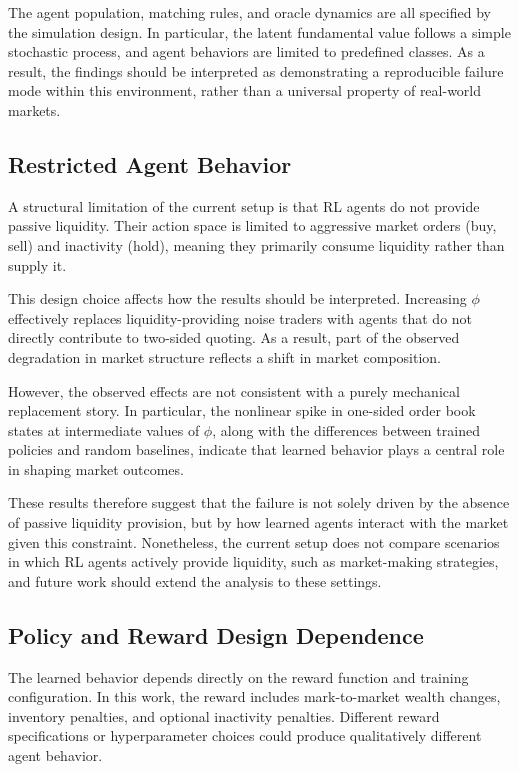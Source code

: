\documentclass[11pt]{article}
\begin{document}
The agent population, matching rules, and oracle dynamics are all specified by the simulation design. In particular, the latent fundamental value follows a simple stochastic process, and agent behaviors are limited to predefined classes. As a result, the findings should be interpreted as demonstrating a reproducible failure mode within this environment, rather than a universal property of real-world markets.

\subsection{Restricted Agent Behavior}

A structural limitation of the current setup is that RL agents do not provide passive liquidity. Their action space is limited to aggressive market orders (buy, sell) and inactivity (hold), meaning they primarily consume liquidity rather than supply it.

This design choice affects how the results should be interpreted. Increasing $\phi$ effectively replaces liquidity-providing noise traders with agents that do not directly contribute to two-sided quoting. As a result, part of the observed degradation in market structure reflects a shift in market composition.

However, the observed effects are not consistent with a purely mechanical replacement story. In particular, the nonlinear spike in one-sided order book states at intermediate values of $\phi$, along with the differences between trained policies and random baselines, indicate that learned behavior plays a central role in shaping market outcomes.

These results therefore suggest that the failure is not solely driven by the absence of passive liquidity provision, but by how learned agents interact with the market given this constraint. Nonetheless, the current setup does not compare scenarios in which RL agents actively provide liquidity, such as market-making strategies, and future work should extend the analysis to these settings.

\subsection{Policy and Reward Design Dependence}

The learned behavior depends directly on the reward function and training configuration. In this work, the reward includes mark-to-market wealth changes, inventory penalties, and optional inactivity penalties. Different reward specifications or hyperparameter choices could produce qualitatively different agent behavior.
\end{document}
